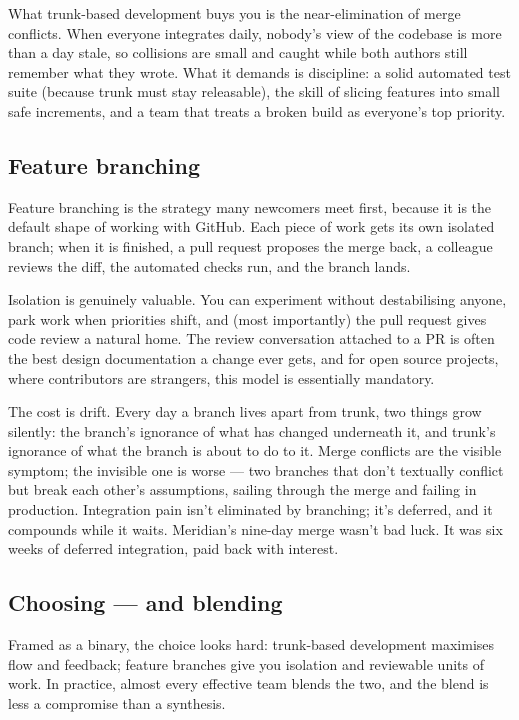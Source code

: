 What trunk-based development buys you is the near-elimination of merge conflicts. When everyone integrates daily, nobody's view of the codebase is more than a day stale, so collisions are small and caught while both authors still remember what they wrote. What it demands is discipline: a solid automated test suite (because trunk must stay releasable), the skill of slicing features into small safe increments, and a team that treats a broken build as everyone's top priority.



\subsection{Feature branching}


Feature branching is the strategy many newcomers meet first, because it is the default shape of working with GitHub. Each piece of work gets its own isolated branch; when it is finished, a pull request proposes the merge back, a colleague reviews the diff, the automated checks run, and the branch lands.


Isolation is genuinely valuable. You can experiment without destabilising anyone, park work when priorities shift, and (most importantly) the pull request gives code review a natural home. The review conversation attached to a PR is often the best design documentation a change ever gets, and for open source projects, where contributors are strangers, this model is essentially mandatory.


The cost is drift. Every day a branch lives apart from trunk, two things grow silently: the branch's ignorance of what has changed underneath it, and trunk's ignorance of what the branch is about to do to it. Merge conflicts are the visible symptom; the invisible one is worse — two branches that don't textually conflict but break each other's assumptions, sailing through the merge and failing in production. Integration pain isn't eliminated by branching; it's deferred, and it compounds while it waits. Meridian's nine-day merge wasn't bad luck. It was six weeks of deferred integration, paid back with interest.



\subsection{Choosing — and blending}


Framed as a binary, the choice looks hard: trunk-based development maximises flow and feedback; feature branches give you isolation and reviewable units of work. In practice, almost every effective team blends the two, and the blend is less a compromise than a synthesis.


